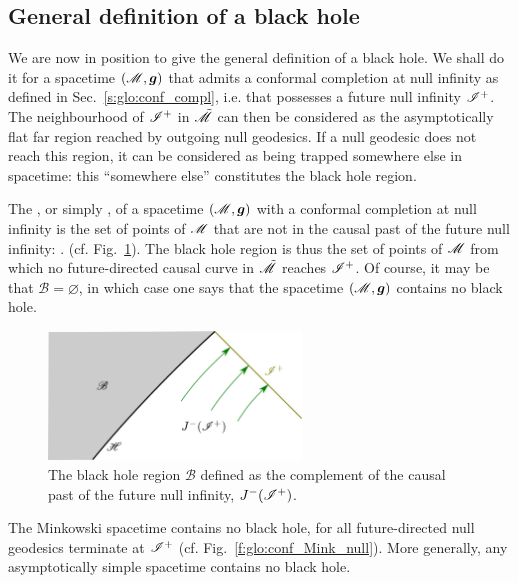 \subsection{General definition of a black hole} \label{s:glo:def_BH}

We are now in position to give the general definition of a black hole.
We shall do it for a spacetime $(\mathscr{M},\bm{g})$ that admits a conformal completion
at null infinity as defined in Sec.~\ref{s:glo:conf_compl}, i.e. that
possesses a future null infinity $\mathscr{I}^+$. The neighbourhood of $\mathscr{I}^+$
in $\tilde{\mathscr{M}}$ can then be considered as the asymptotically flat far region
reached by outgoing null geodesics. If a null geodesic does not reach this
region, it can be considered as being trapped somewhere else in spacetime: this
``somewhere else'' constitutes the black hole region.


The , or simply , of a
spacetime $(\mathscr{M},\bm{g})$ with a conformal completion at null infinity is
the set of points of $\mathscr{M}$ that are not in the causal past of the future null infinity:
\be \label{e:glo:def_BH}
     .
\ee
(cf. Fig.~\ref{f:glo:def_bh}).
The black hole region is thus the set of points of $\mathscr{M}$
from which no future-directed causal curve in $\tilde{\mathscr{M}}$ reaches $\mathscr{I}^+$.
Of course, it may be that $\mathscr{B} = \varnothing$, in which case one
says that the spacetime $(\mathscr{M},\bm{g})$ contains no black hole.

\begin{figure}
\centerline{\includegraphics[width=0.6\textwidth]{glo_def_bh.pdf}}
\caption[]{\label{f:glo:def_bh} \footnotesize
The black hole region $\mathscr{B}$ defined as the complement of
the causal past of the future null infinity, $J^-(\mathscr{I}^+)$.}
\end{figure}


\begin{example}
The Minkowski spacetime contains no black hole, for all future-directed null geodesics
terminate at $\mathscr{I}^+$ (cf. Fig.~\ref{f:glo:conf_Mink_null}).
More generally, any asymptotically simple spacetime contains no black hole.
\end{example}


